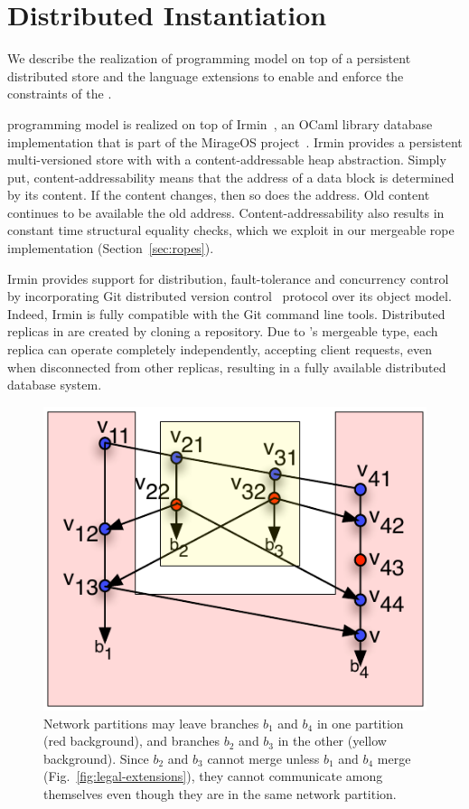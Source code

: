 \section{Distributed Instantiation}
\label{sec:implementation}

We describe the realization of \name programming model on top of a persistent
distributed store and the language extensions to enable and enforce the
constraints of the \name.

\name programming model is realized on top of Irmin~\cite{irmin}, an OCaml
library database implementation that is part of the MirageOS
project~\cite{mirage}. Irmin provides a persistent multi-versioned store with
with a content-addressable heap abstraction. Simply put, content-addressability
means that the address of a data block is determined by its content. If the
content changes, then so does the address. Old content continues to be
available the old address. Content-addressability also results in constant time
structural equality checks, which we exploit in our mergeable rope
implementation (Section~\ref{sec:ropes}).

Irmin provides support for distribution, fault-tolerance and concurrency
control by incorporating Git distributed version control~\cite{git} protocol
over its object model. Indeed, Irmin is fully compatible with the Git command
line tools. Distributed replicas in \name are created by cloning a \name
repository. Due to \name's mergeable type, each replica can operate completely
independently, accepting client requests, even when disconnected from other
replicas, resulting in a fully available distributed database system.

\begin{figure}
	\begin{center}
	\includegraphics[scale=0.8]{Figures/partitions}
	\end{center}
	\caption{Network partitions may leave branches $b_1$ and $b_4$ in one
		partition (red background), and branches $b_2$ and $b_3$ in the other (yellow
		background). Since $b_2$ and $b_3$ cannot merge unless $b_1$ and $b_4$ merge
		(Fig.~\ref{fig:legal-extensions}), they cannot communicate among themselves
		even though they are in the same network partition.}
	\label{fig:partitions}
\end{figure}

